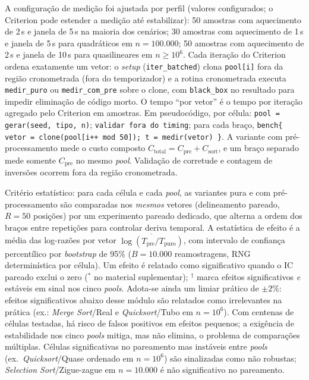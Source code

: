 \documentclass[portuguese]{sbc2025}%
\begin{document}
A configuração de medição foi ajustada por perfil (valores configurados; o Criterion pode estender a medição até estabilizar): 50 amostras com aquecimento de 2\,s e janela de 5\,s na maioria dos cenários; 30 amostras com aquecimento de 1\,s e janela de 5\,s para quadráticos em $n{=}100.000$; 50 amostras com aquecimento de 2\,s e janela de 10\,s para quasilineares em $n{\ge}10^6$. Cada iteração do Criterion ordena exatamente um vetor: o \emph{setup} (\texttt{iter\_batched}) clona \texttt{pool[i]} fora da região cronometrada (fora do temporizador) e a rotina cronometrada executa \texttt{medir\_puro} ou \texttt{medir\_com\_pre} sobre o clone, com \texttt{black\_box} no resultado para impedir eliminação de código morto. O tempo ``por vetor'' é o tempo por iteração agregado pelo Criterion em amostras. Em pseudocódigo, por célula: \texttt{pool = gerar(seed, tipo, n)}; \texttt{validar fora do timing}; para cada braço, \texttt{bench\{ vetor = clone(pool[i++ mod 50]); t = medir(vetor) \}}. A variante com pré-processamento mede o custo composto $C_{\text{total}} = C_{\text{pre}} + C_{\text{sort}}$, e um braço separado mede somente $C_{\text{pre}}$ no mesmo \emph{pool}. Validação de corretude e contagem de inversões ocorrem fora da região cronometrada.

Critério estatístico: para cada célula e cada \emph{pool}, as variantes pura e com pré-processamento são comparadas nos \emph{mesmos} vetores (delineamento pareado, $R{=}50$ posições) por um experimento pareado dedicado, que alterna a ordem dos braços entre repetições para controlar deriva temporal. A estatística de efeito é a média das log-razões por vetor $\overline{\log(T_{\text{pre}}/T_{\text{puro}})}$, com intervalo de confiança percentílico por \emph{bootstrap} de 95\% ($B{=}10.000$ reamostragens, RNG determinística por célula). Um efeito é relatado como significativo quando o IC pareado exclui o zero ($^{*}$ no material suplementar); $^{\dagger}$ marca efeitos significativos \emph{e} estáveis em sinal nos cinco \emph{pools}. Adota-se ainda um limiar prático de $\pm 2\%$: efeitos significativos abaixo desse módulo são relatados como irrelevantes na prática (ex.: \emph{Merge Sort}/Real e \emph{Quicksort}/Tubo em $n{=}10^6$). Com centenas de células testadas, há risco de falsos positivos em efeitos pequenos; a exigência de estabilidade nos cinco \emph{pools} mitiga, mas não elimina, o problema de comparações múltiplas. Células significativas no pareamento mas instáveis entre \emph{pools} (ex.\ \emph{Quicksort}/Quase ordenado em $n{=}10^6$) são sinalizadas como não robustas; \emph{Selection Sort}/Zigue-zague em $n{=}10.000$ é não significativo no pareamento.
\end{document}
